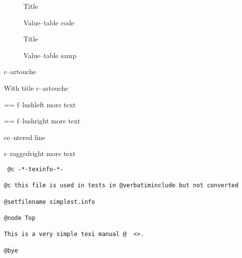 \documentclass{book}
\makeatletter
\newcommand\Texinfotablestylesamp[1]{\ifstrempty{#1}{}{`\texttt{#1}'}}%
\newenvironment{Texinfopreformatted}{%
  \par\GNUTobeylines\obeyspaces\frenchspacing\parskip=\z@\parindent=\z@}{}
{\catcode`\^^M=13 \gdef\GNUTobeylines{\catcode`\^^M=13 \def^^M{\null\par}}}
\renewcommand{\_}{\Texinfounderscore\discretionary{}{}{}}
\makeatother
\begin{document}
\begin{titlepage}
\begin{description}
\item[] Title
\item[{\parbox[b]{\linewidth}{%
\texttt{a{-}{-}code}}}]
Value--table code
\end{description}

\begin{description}
\item[] Title
\item[{\parbox[b]{\linewidth}{%
\Texinfotablestylesamp{a{-}{-}samp}\\
\Texinfotablestylesamp{a2{-}{-}samp}}}]
Value--table samp
\end{description}

\begin{mdframed}[style=Texinfocartouche]
c--artouche
\end{mdframed}

\begin{mdframed}[style=Texinfocartouche, frametitle={Tit--le \emph{of box}}]
With title c--artouche
\end{mdframed}

\begin{flushleft}
\begin{Texinfopreformatted}%
f--lushleft
more text
\end{Texinfopreformatted}
\end{flushleft}

\begin{flushright}
\begin{Texinfopreformatted}%
f--lushright
more text
\end{Texinfopreformatted}
\end{flushright}

\begin{center}
ce--ntered line
\end{center}

\begin{flushleft}
r--raggedright
more text
\end{flushleft}

\begin{verbatim}
 @c -*-texinfo-*-

@c this file is used in tests in @verbatiminclude but not converted

@setfilename simplest.info

@node Top

This is a very simple texi manual @  <>.

@bye
\end{verbatim}


\end{titlepage}
\end{document}

